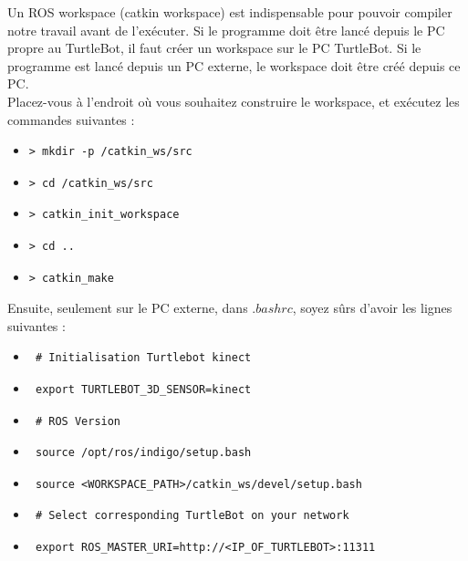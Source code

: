 \documentclass[10pt,a4paper]{article}
\begin{document}
Un ROS workspace (catkin workspace) est indispensable pour pouvoir compiler notre travail avant de l'exécuter. Si le programme doit être lancé depuis le PC propre au TurtleBot, il faut créer un workspace sur le PC TurtleBot. Si le programme est lancé depuis un PC externe, le workspace doit être créé depuis ce PC.\\

Placez-vous à l'endroit où vous souhaitez construire le workspace, et exécutez les commandes suivantes :

\begin{itemize}
\item[]  \begin{verbatim}> mkdir -p /catkin_ws/src \end{verbatim}
\item[]  \begin{verbatim}> cd /catkin_ws/src \end{verbatim}
\item[]  \begin{verbatim}> catkin_init_workspace \end{verbatim}
\item[]  \begin{verbatim}> cd .. \end{verbatim}
\item[]  \begin{verbatim}> catkin_make \end{verbatim}
\end{itemize}

\newpage

Ensuite, seulement sur le PC externe, dans $.bashrc$, soyez sûrs d'avoir les lignes suivantes :

\begin{itemize}
\item[]  \begin{verbatim} # Initialisation Turtlebot kinect \end{verbatim}
\item[]  \begin{verbatim} export TURTLEBOT_3D_SENSOR=kinect \end{verbatim}
\item[]  \begin{verbatim} # ROS Version \end{verbatim}
\item[]  \begin{verbatim} source /opt/ros/indigo/setup.bash \end{verbatim}
\item[]  \begin{verbatim} source <WORKSPACE_PATH>/catkin_ws/devel/setup.bash \end{verbatim}
\item[]  \begin{verbatim} # Select corresponding TurtleBot on your network \end{verbatim}
\item[]  \begin{verbatim} export ROS_MASTER_URI=http://<IP_OF_TURTLEBOT>:11311  \end{verbatim}
\end{itemize}
\end{document}
